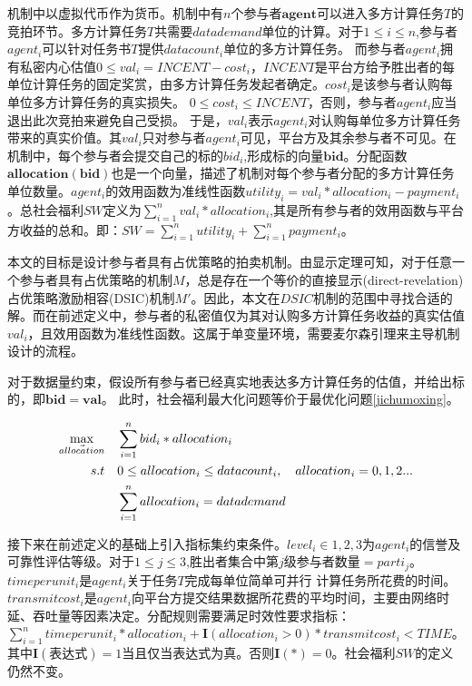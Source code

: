 \documentclass[promaster]{thesis-uestc}
\begin{document}
机制中以虚拟代币作为货币。机制中有$n$个参与者$\mathbf{agent}$可以进入多方计算任务$T$的竞拍环节。多方计算任务$T$共需要$datademand$单位的计算。对于$1\leq i\leq n$,参与者$agent_i$可以针对任务书$T$提供$datacount_i$单位的多方计算任务。
而参与者$agent_i$拥有私密内心估值$0 \leq val_i = INCENT-cost_i$，$INCENT$是平台方给予胜出者的每单位计算任务的固定奖赏，由多方计算任务发起者确定。$cost_i$是该参与者认购每单位多方计算任务的真实损失。 $0 \leq cost_i \leq INCENT$，否则，参与者$agent_i$应当退出此次竞拍来避免自己受损。 于是，$val_i$表示$agent_i$对认购每单位多方计算任务带来的真实价值。其$val_i$只对参与者$agent_i$可见，平台方及其余参与者不可见。在机制中，每个参与者会提交自己的标的$bid_i$,形成标的向量$\mathbf{bid}$。分配函数$\mathbf{allocation}(\mathbf{bid})$也是一个向量，描述了机制对每个参与者分配的多方计算任务单位数量。$agent_i$的效用函数为准线性函数$utility_i = val_i*allocation_i-payment_i$。总社会福利$SW$定义为$\sum_{i=1}^n{val_i*allocation_i}$,其是所有参与者的效用函数与平台方收益的总和。即：$SW = \sum_{i=1}^n{utility_i}+\sum_{i=1}^{n}{payment_i}$。

本文的目标是设计参与者具有占优策略的拍卖机制。由显示定理可知，对于任意一个参与者具有占优策略的机制$M$，总是存在一个等价的直接显示(direct-revelation)占优策略激励相容(DSIC)机制$M'$。因此，本文在$DSIC$机制的范围中寻找合适的解。而在前述定义中，参与者的私密值仅为其对认购多方计算任务收益的真实估值$val_i$，且效用函数为准线性函数。这属于单变量环境，需要麦尔森引理来主导机制设计的流程。

对于数据量约束，假设所有参与者已经真实地表达多方计算任务的估值，并给出标的，即$\mathbf{bid} = \mathbf{val}$。 此时，社会福利最大化问题等价于最优化问题\ref{jichumoxing}。

\begin{align}
    \label{jichumoxing}\max_{\vec{allocation}} \quad&\sum_{i=1}^{n}{bid_i*allocation_i}\\
    s.t                     \quad& 0\leq allocation_i\leq datacount_i,\quad allocation_i = {0,1,2...}\notag\\
                            \quad& \sum_{i=1}^{n}{allocation_i} = datademand\notag 
\end{align}

接下来在前述定义的基础上引入指标集约束条件。$level_i\in {1,2,3}$为$agent_i$的信誉及可靠性评估等级。对于$1\leq j \leq 3$,胜出者集合中第$j$级参与者数量$=parti_j$。$timeperunit_i$是$agent_i$关于$任务T$完成每单位简单可并行
计算任务所花费的时间。$transmitcost_i$是$agent_i$向平台方提交结果数据所花费的平均时间，主要由网络时延、吞吐量等因素决定。分配规则需要满足时效性要求指标：$\sum_{i=1}^{n}{timeperunit_i*allocation_i+\mathbf{I}(allocation_i > 0)*transmitcost_i} < TIME$。
其中$\mathbf{I}(\text{表达式}) = 1$当且仅当表达式为真。否则$\mathbf{I}(\text{*}) = 0$。社会福利$SW$的定义仍然不变。
\end{document}

